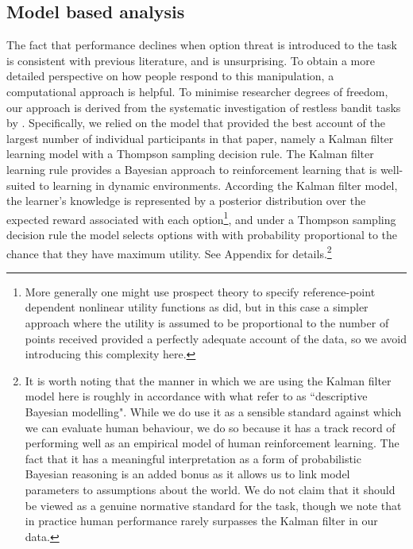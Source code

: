 \documentclass[a4paper,doc,natbib]{apa6}
\begin{document}
\subsection{Model based analysis}

The fact that performance declines when option threat is introduced to the task is consistent with previous literature, and is unsurprising. To obtain a more detailed perspective on how people respond to this manipulation, a computational approach is helpful. To minimise researcher degrees of freedom, our approach is derived from the systematic investigation of restless bandit tasks by \cite{speekenbrink2015uncertainty}. Specifically, we relied on the model that provided the best account of the largest number of individual participants in that paper, namely a Kalman filter learning model with a Thompson sampling decision rule. The Kalman filter learning rule provides a Bayesian approach to reinforcement learning \citep{daw2006cortical} that is well-suited to learning in dynamic environments. According the Kalman filter model, the learner's knowledge is represented by a posterior distribution over the expected reward associated with each option\footnote{More generally one might use prospect theory \protect\citep{tversky1992advances} to specify reference-point dependent nonlinear utility functions as \protect\cite{speekenbrink2015uncertainty} did, but in this case a simpler approach where the utility is assumed to be proportional to the number of points received provided a perfectly adequate account of the data, so we avoid introducing this complexity here.}, and under a Thompson sampling decision rule the model selects options with with probability proportional to the chance that they have maximum utility. See Appendix for details.\footnote{It is worth noting that the manner in which we are using the Kalman filter model here is roughly in accordance with what \citep{tauber2017bayesian} refer to as ``descriptive Bayesian modelling". While we do use it as a sensible standard against which we can evaluate human behaviour, we do so because it has a track record of performing well as an empirical model of human reinforcement learning. The fact that it has a meaningful interpretation as a form of probabilistic Bayesian reasoning is an added bonus as it allows us to link model parameters to assumptions about the world. We do not claim that it should be viewed as a genuine normative standard for the task, though we note that in practice human performance rarely surpasses the Kalman filter in our data.}
\end{document}
